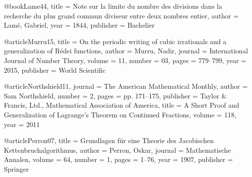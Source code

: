 \documentclass[english,version-2020-11]{uzl-thesis}
\begin{document}
\begin{bibtex-entries}
@book{Lame44,
  title     = {Note sur la limite du nombre des divisions dans la recherche du plus grand commun diviseur entre deux nombres entier},
  author    = {Lam{\'e}, Gabriel},
  year      = {1844},
  publisher = {Bachelier}
}

@article{Murru15,
  title     = {On the periodic writing of cubic irrationals and a generalization of R{\'e}dei functions},
  author    = {Murru, Nadir},
  journal   = {International Journal of Number Theory},
  volume    = {11},
  number    = {03},
  pages     = {779--799},
  year      = {2015},
  publisher = {World Scientific}
}

@article{Northshield11,
	journal   = {The American Mathematical Monthly},
	author    = {Sam Northshield},
	number    = {2},
	pages     = {pp. 171--175},
	publisher = {Taylor & Francis, Ltd., Mathematical Association of America},
	title     = {A Short Proof and Generalization of Lagrange’s Theorem on Continued Fractions},
	volume    = {118},
	year      = {2011}
}

@article{Perron07,
  title     = {Grundlagen f{\"u}r eine Theorie des Jacobischen Kettenbruchalgorithmus},
  author    = {Perron, Oskar},
  journal   = {Mathematische Annalen},
  volume    = {64},
  number    = {1},
  pages     = {1--76},
  year      = {1907},
  publisher = {Springer}
}
\end{bibtex-entries}
\end{document}
